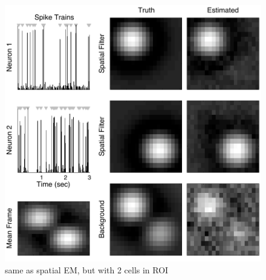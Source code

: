 \begin{figure}[H]
\centering \includegraphics[width=.9\linewidth]{../figs/spatial_multi}
\caption{same as spatial EM, but with 2 cells in ROI} \label{fig:spatial_multi}
\end{figure}

